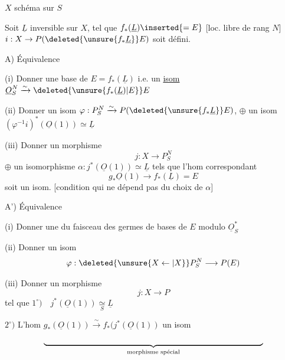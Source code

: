 $X$ schéma \uline{} sur $S$

 Soit $\underline{L}$ inversible  sur $X$, tel que $f_{*}(\underline{L})\inserted{=E}$ [loc. libre de rang $N$]  $i:X\to P(\deleted{\unsure{f_{*}\underline{L}}}E)$ soit défini.

A) Équivalence

(i) Donner une base de $E=f_{*}(\underline{L})$ i.e. un \uline{isom} $\underline{O}_{S}^{N}\xrightarrow{\sim}\deleted{\unsure{f_{*}(\underline{L})|E}}E$

(ii) Donner un isom $\varphi:P_{S}^{N}\xrightarrow{\sim}P(\deleted{\unsure{f_{*}\underline{L}}}E)$, $\oplus$ un isom $(\varphi^{-1}i)^{*}(\underline{O}(1))\simeq\underline{L}$

(iii) Donner un  morphisme
\[
j:X\longrightarrow P_{S}^{N}
\]
$\oplus$ un isomorphisme $\alpha:j^{*}(\underline{O}(1))\simeq\underline{L}$
tels que l'hom correspondant
\[
g_{*}\underline{O}(1)\longrightarrow f_{*}(\underline{L})=E
\]
soit un isom. [condition qui ne dépend pas du choix de $\alpha$]

A') Équivalence

(i) Donner une   du faisceau des germes de bases de $E$ modulo $\underline{O}_{S}^{*}$

(ii) Donner un isom
\[
\varphi:\deleted{\unsure{X\leftarrow|X}}P_{S}^{N}\longrightarrow P(E)
\]

(iii) Donner un morphisme
\[
j:X\longrightarrow P
\]
tel que \quad $1^{\circ})\quad j^{*}(\underline{O}(1))\underset{S}{\simeq}\underline{L}$ 

$2^{\circ})$ \quad L'hom $g_{*}(\underline{O}(1))\xrightarrow{\sim}f_{*}(j^{*}(\underline{O}(1))$ un isom
\[
\underbrace{\hspace{.77\linewidth}}_{\text{morphisme spécial}}
\]

